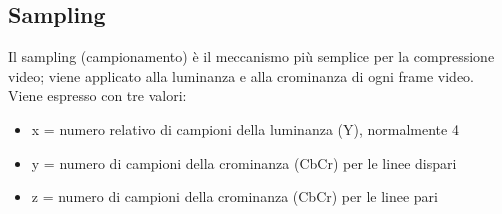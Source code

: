 \documentclass[a4paper,11pt]{article} %
\begin{document}
\subsection{Sampling}
Il sampling (campionamento) è il meccanismo più semplice per la compressione video; viene applicato alla luminanza e alla crominanza di ogni frame video.\\
Viene espresso con tre valori:
\begin{itemize}
\item x = numero relativo di campioni della luminanza (Y), normalmente 4
\item y = numero di campioni della crominanza (CbCr) per le linee dispari
\item z = numero di campioni della crominanza (CbCr) per le linee pari
\end{itemize}
\end{document}
